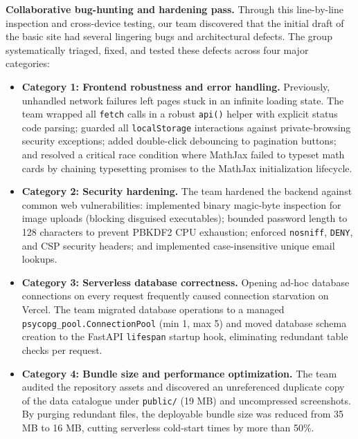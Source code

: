 \textbf{Collaborative bug-hunting and hardening pass.}
Through this line-by-line inspection and cross-device testing, our team discovered that the initial draft of
the basic site had several lingering bugs and architectural defects. The group systematically triaged, fixed,
and tested these defects across four major categories:
\begin{itemize}
  \item \textbf{Category 1: Frontend robustness and error handling.}
        Previously, unhandled network failures left pages stuck in an infinite loading state. The team wrapped all
        \texttt{fetch} calls in a robust \texttt{api()} helper with explicit status code parsing; guarded all
        \texttt{localStorage} interactions against private-browsing security exceptions; added double-click debouncing
        to pagination buttons; and resolved a critical race condition where MathJax failed to typeset math cards
        by chaining typesetting promises to the MathJax initialization lifecycle.
  \item \textbf{Category 2: Security hardening.}
        The team hardened the backend against common web vulnerabilities: implemented binary magic-byte inspection
        for image uploads (blocking disguised executables); bounded password length to 128 characters to prevent
        PBKDF2 CPU exhaustion; enforced \texttt{nosniff}, \texttt{DENY}, and CSP security headers; and implemented
        case-insensitive unique email lookups.
  \item \textbf{Category 3: Serverless database correctness.}
        Opening ad-hoc database connections on every request frequently caused connection starvation on Vercel.
        The team migrated database operations to a managed \texttt{psycopg\_pool.ConnectionPool} (min 1, max 5)
        and moved database schema creation to the FastAPI \texttt{lifespan} startup hook, eliminating redundant
        table checks per request.
  \item \textbf{Category 4: Bundle size and performance optimization.}
        The team audited the repository assets and discovered an unreferenced duplicate copy of the data catalogue
        under \texttt{public/} (19 MB) and uncompressed screenshots. By purging redundant files, the deployable
        bundle size was reduced from 35 MB to 16 MB, cutting serverless cold-start times by more than 50\%.
\end{itemize}

